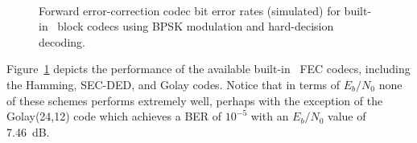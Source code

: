 \begin{figure}
\centering
\mbox{
} \quad
\mbox{
   \quad
}
\caption{Forward error-correction codec bit error rates (simulated)
         for built-in \liquid\ block codecs
         using BPSK modulation and hard-decision decoding.}
\label{fig:fec:block_ber}
\end{figure}
%
Figure~\ref{fig:fec:block_ber} depicts the performance of the
available built-in \liquid\ FEC codecs, including
the Hamming, SEC-DED, and Golay codes.
Notice that in terms of $E_b/N_0$ none of these schemes performs
extremely well,
perhaps with the exception of the Golay(24,12) code which achieves a BER
of $10^{-5}$ with an $E_b/N_0$ value of 7.46~dB.


